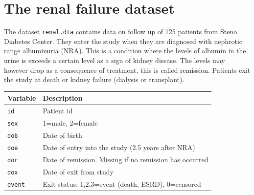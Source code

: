 \documentclass[
]{book}
\begin{document}
\section{The renal failure dataset}\label{the-renal-failure-dataset}

The dataset \texttt{renal.dta} contains data on follow up of 125
patients from Steno Diabetes Center. They enter the study when they
are diagnosed with nephrotic range albuminuria (NRA). This is a
condition where the levels of albumin in the urine is exceeds a
certain level as a sign of kidney disease. The levels may however drop
as a consequence of treatment, this is called remission. Patients exit
the study at death or kidney failure (dialysis or transplant).

\begin{longtable}[]{@{}ll@{}}
\toprule\noalign{}
Variable & Description \\
\midrule\noalign{}
\endhead
\bottomrule\noalign{}
\endlastfoot
\texttt{id} & Patient id \\
\texttt{sex} & 1=male, 2=female \\
\texttt{dob} & Date of birth \\
\texttt{doe} & Date of entry into the study (2.5 years after NRA) \\
\texttt{dor} & Date of remission. Missing if no remission has occurred \\
\texttt{dox} & Date of exit from study \\
\texttt{event} & Exit status: 1,2,3=event (death, ESRD), 0=censored \\
\end{longtable}
\end{document}
